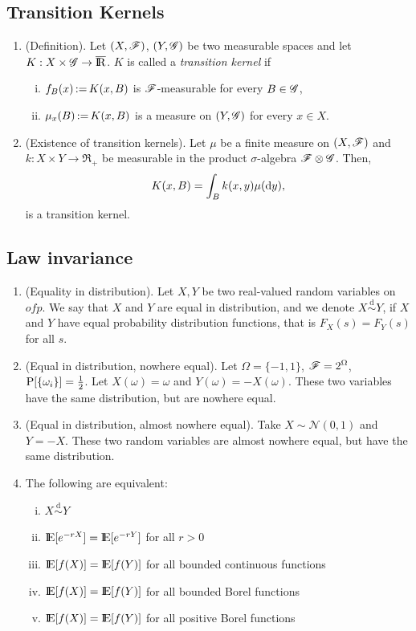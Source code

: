 \documentclass[a4paper,10pt]{article}
\begin{document}
\subsection{Transition Kernels}
\begin{enumerate}
 \item (Definition). Let $(X,\mathscr{F})$, $(Y,\mathscr{G})$ be two measurable spaces and let $K:X\times \G\to\barre$.
       $K$ is called a \textit{transition kernel} if
       \begin{enumerate}[i.]
        \item $f_B(x) {}\mathop{\mathrel{:}=}{} K(x,B)$ is $\mathscr{F}$-measurable for every $B\in\mathscr{G}$,
        \item $\mu_x(B) {}\mathop{\mathrel{:}=}{} K(x,B)$ is a measure on $(Y,\mathscr{G})$ for every $x\in X$.
       \end{enumerate}
 \item (Existence of transition kernels). Let $\mu$ be a finite measure on $(X,\mathscr{F})$ and $k:X\times Y\to\Re_+$
       be measurable in the product $\sigma$-algebra $\mathscr{F}\otimes \mathscr{G}$. Then,
       \[
        K(x,B) = \int_B k(x,y) \mu(\mathrm{d} y),
       \]
       is a transition kernel.
\end{enumerate}

\subsection{Law invariance}
\begin{enumerate}
 \item (Equality in distribution). 
      Let $X,Y$ be two real-valued random variables on $ofp$.
      We say that $X$ and $Y$ are equal in distribution, and we denote $X\overset{\mathrm{d}}{\sim} Y$,
      if $X$ and $Y$ have equal probability distribution functions, that is $F_X(s) = F_Y(s)$ for all $s$.

 \item (Equal in distribution, nowhere equal). Let $\Omega = \{-1,1\}$, $\mathscr{F}=2^\Omega$, $\mathrm{P}[\{\omega_i\}]=\frac{1}{2}$.
       Let $X(\omega) = \omega$ and $Y(\omega) = -X(\omega)$. These two variables have the same distribution, but 
       are nowhere equal.
 
 \item (Equal in distribution, almost nowhere equal). Take $X\sim \mathcal{N}(0,1)$ and $Y=-X$. These 
       two random variables are almost nowhere equal, but have the same distribution.
       
 \item The following are equivalent:
      \begin{enumerate}[i.]
       \item $X\overset{\mathrm{d}}{\sim} Y$
       \item $\E[e^{-rX}]=\E[e^{-rY}]$ for all $r>0$
       \item $\E[f(X)] = \E[f(Y)]$ for all bounded continuous functions
       \item $\E[f(X)] = \E[f(Y)]$ for all bounded Borel functions
       \item $\E[f(X)] = \E[f(Y)]$ for all positive Borel functions	
      \end{enumerate}

\end{enumerate}
\end{document}
